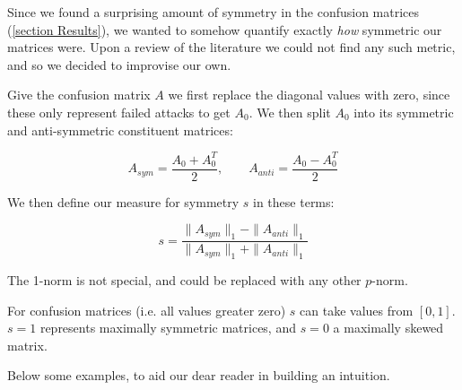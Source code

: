 \documentclass{article}
\begin{document}
Since we found a surprising amount of symmetry in the confusion matrices (\ref{section Results}), we wanted to somehow quantify exactly \textit{how} symmetric our matrices were. Upon a review of the literature we could not find any such metric, and so we decided to improvise our own.

Give the confusion matrix $A$ we first replace the diagonal values with zero, since these only represent failed attacks to get $A_0$. We then split $A_0$ into its symmetric and anti-symmetric constituent matrices:

\begin{equation}
	A_{sym} = \frac{A_0 + A_0^T}{2}, \qquad
	A_{anti} = \frac{A_0 - A_0^T}{2}
\end{equation}

We then define our measure for symmetry $s$ in these terms:

\begin{equation}
	s = \frac{ \|A_{sym}\|_1 - \|A_{anti}\|_1}{\|A_{sym}\|_1 + \|A_{anti}\|_1}
\end{equation}

The 1-norm is not special, and could be replaced with any other $p$-norm.

For confusion matrices (i.e. all values greater zero) $s$ can take values from $[0,1]$. $s = 1$ represents maximally symmetric matrices, and $s = 0$ a maximally skewed matrix.

Below some examples, to aid our dear reader in building an intuition.
\end{document}
